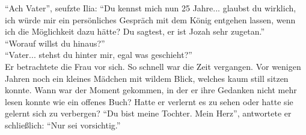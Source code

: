 ``Ach Vater'', seufzte Ilia: ``Du kennst mich nun 25 Jahre... glaubst du wirklich, ich würde mir 
ein persönliches Gespräch mit dem König entgehen lassen, wenn ich die Möglichkeit dazu hätte? Du 
sagtest, er ist Jozah sehr zugetan.''\\
``Worauf willst du hinaus?''\\
``Vater... stehst du hinter mir, egal was geschieht?''\\
Er betrachtete die Frau vor sich. So schnell war die Zeit vergangen. Vor wenigen Jahren noch ein 
kleines Mädchen mit wildem Blick, welches kaum still sitzen konnte. Wann war der Moment gekommen, 
in der er ihre Gedanken nicht mehr lesen konnte wie ein offenes Buch? Hatte er verlernt es zu sehen 
oder hatte sie gelernt sich zu verbergen? ``Du bist meine Tochter. Mein Herz'', antwortete er 
schließlich: ``Nur sei vorsichtig.''\\

